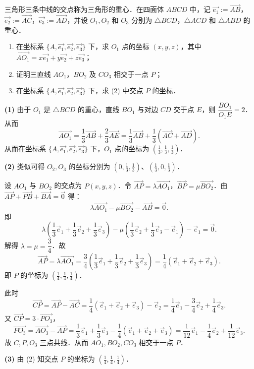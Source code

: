 
三角形三条中线的交点称为三角形的重心．在四面体 $ABCD$ 中，记 $\overrightarrow{e_1}:=\overrightarrow{AB}$，$\overrightarrow{e_2}:=\overrightarrow{AC}$，$\overrightarrow{e_3}:=\overrightarrow{AD}$，并设 $O_1,O_2$ 和 $O_3$ 分别为 $\triangle BCD$，$\triangle ACD$ 和 $\triangle ABD$ 的重心．
\begin{enumerate}[label=(\arabic*)]
  \item 在坐标系 $\{A,\overrightarrow{e_1},\overrightarrow{e_2},\overrightarrow{e_3}\}$ 下，求 $O_1$ 点的坐标 $(x,y,z)$，其中 $\overrightarrow{AO_1}=x\overrightarrow{e_1}+y\overrightarrow{e_2}+z\overrightarrow{e_3}$；
  \item 证明三直线 $AO_1$，$BO_2$ 及 $CO_3$ 相交于一点 $P$；
  \item 在坐标系 $\{A,\overrightarrow{e_1},\overrightarrow{e_2},\overrightarrow{e_3}\}$ 下，求 (2) 中交点 $P$ 的坐标．
\end{enumerate}
\begin{solution}
\textbf{(1)} 由于 $O_1$ 是 $\triangle BCD$ 的重心，直线 $BO_1$ 与对边 $CD$ 交于点 $E$，则 $\dfrac{BO_1}{O_1E}=2$．从而
\[
  \overrightarrow{AO_1}=\frac{1}{3}\overrightarrow{AB}+\frac{2}{3}\overrightarrow{AE}
  =\frac{1}{3}\overrightarrow{AB}+\frac{1}{3}\left(\overrightarrow{AC}+\overrightarrow{AD}\right).
\]
从而在坐标系 $\{A,\overrightarrow{e_1},\overrightarrow{e_2},\overrightarrow{e_3}\}$ 下，$O_1$ 点的坐标为 $\left(\frac{1}{3},\frac{1}{3},\frac{1}{3}\right)$．

\textbf{(2)} 类似可得 $O_2,O_3$ 的坐标分别为 $\left(0,\frac{1}{3},\frac{1}{3}\right)$、$\left(\frac{1}{3},0,\frac{1}{3}\right)$．

设 $AO_1$ 与 $BO_2$ 的交点为 $P(x,y,z)$．令 $\overrightarrow{AP}=\lambda\overrightarrow{AO_1}$，$\overrightarrow{BP}=\mu\overrightarrow{BO_2}$．由 $\overrightarrow{AP}+\overrightarrow{PB}+\overrightarrow{BA}=\vec{0}$ 得：
\[
  \lambda\overrightarrow{AO_1}-\mu\overrightarrow{BO_2}-\overrightarrow{AB}=\vec{0}.
\]
即
\[
  \lambda\left(\frac{1}{3}\vec{e}_1+\frac{1}{3}\vec{e}_2+\frac{1}{3}\vec{e}_3\right)
  -\mu\left(\frac{1}{3}\vec{e}_2+\frac{1}{3}\vec{e}_3-\vec{e}_1\right)-\vec{e}_1=\vec{0}.
\]
解得 $\lambda=\mu=\dfrac{3}{4}$．故
\[
  \overrightarrow{AP}=\lambda\overrightarrow{AO_1}
  =\frac{3}{4}\left(\frac{1}{3}\vec{e}_1+\frac{1}{3}\vec{e}_2+\frac{1}{3}\vec{e}_3\right)
  =\frac{1}{4}(\vec{e}_1+\vec{e}_2+\vec{e}_3).
\]
即 $P$ 的坐标为 $\left(\frac{1}{4},\frac{1}{4},\frac{1}{4}\right)$．

此时
\[
  \overrightarrow{CP}=\overrightarrow{AP}-\overrightarrow{AC}
  =\frac{1}{4}(\vec{e}_1+\vec{e}_2+\vec{e}_3)-\vec{e}_2
  =\frac{1}{4}\vec{e}_1-\frac{3}{4}\vec{e}_2+\frac{1}{4}\vec{e}_3.
\]
又 $\overrightarrow{CP}=3\cdot\overrightarrow{PO_3}$，
\[
  \overrightarrow{PO_3}=\overrightarrow{AO_3}-\overrightarrow{AP}
  =\frac{1}{3}\vec{e}_1+\frac{1}{3}\vec{e}_3-\frac{1}{4}(\vec{e}_1+\vec{e}_2+\vec{e}_3)
  =\frac{1}{12}\vec{e}_1-\frac{1}{4}\vec{e}_2+\frac{1}{12}\vec{e}_3.
\]
故 $C,P,O_3$ 三点共线．从而 $AO_1,BO_2,CO_3$ 相交于一点 $P$．

\textbf{(3)} 由 (2) 知交点 $P$ 的坐标为 $\left(\frac{1}{4},\frac{1}{4},\frac{1}{4}\right)$．
\end{solution}


